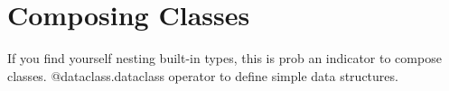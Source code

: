 \section{Composing Classes}

  If you find yourself nesting built-in types, this is prob an indicator to compose classes. @dataclass.dataclass operator to define simple data structures. 

